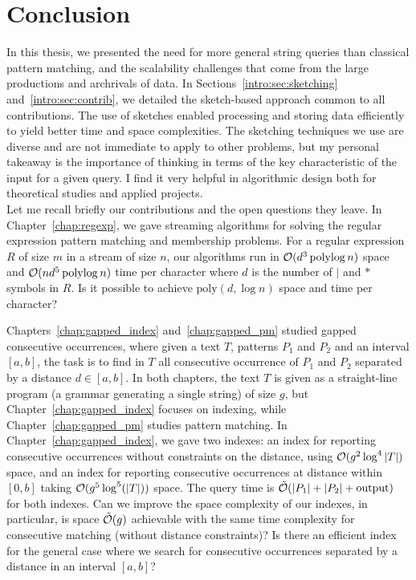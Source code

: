 \clearemptydoublepage
{}
\chapter*{Conclusion}
In this thesis, we presented the need for more general string queries than classical pattern matching, and the scalability challenges that come from the large productions and archrivals of data.
%
In Sections~\ref*{intro:sec:sketching} and~\ref*{intro:sec:contrib}, we detailed the sketch-based approach common to all contributions. The use of sketches enabled processing and storing data efficiently to yield better time and space complexities.
%
The sketching techniques we use are diverse and are not immediate to apply to other problems, but my personal takeaway is the importance of thinking in terms of the key characteristic of the input for a given query. I find it very helpful in algorithmic design both for theoretical studies and applied projects.\\


Let me recall briefly our contributions and the open questions they leave. 
In Chapter~\ref{chap:regexp}, we gave streaming algorithms for solving the regular expression pattern matching and membership problems. For a regular expression $R$ of size $m$ in a stream of size $n$, our algorithms run in $\mathcal{O}(d^3 \operatorname{polylog} n)$ space and $\mathcal{O}(nd^5\operatorname{polylog} n)$ time per character where $d$ is the number of $|$ and $\ast$ symbols in $R$. Is it possible to achieve $\mathrm{poly}(d,\log n)$ space and time per character?

Chapters~\ref{chap:gapped_index} and~\ref{chap:gapped_pm} studied gapped consecutive occurrences, where given a text $T$,  patterns $P_1$ and $P_2$ and an interval $[a,b]$, the task is to find in $T$ all consecutive occurrence of $P_1$ and $P_2$ separated by a distance $d \in [a,b]$. In both chapters, the text $T$ is given as a straight-line program (a grammar generating a single string) of size $g$, but Chapter~\ref{chap:gapped_index} focuses on indexing, while Chapter~\ref{chap:gapped_pm} studies pattern matching. In Chapter~\ref{chap:gapped_index}, we gave two indexes: an index for reporting consecutive occurrences without constraints on the distance, using $\mathcal{O}(g^2\log^4|T|)$ space, and an index for reporting consecutive occurrences at distance within $[0,b]$ taking $\mathcal{O} (g^5\log^5(|T|))$ space. The query time is $\tilde{\mathcal{O}}(|P_1|+|P_2|+\mathrm{output})$ for both indexes. 
%
Can we improve the space complexity of our indexes, in particular, is space $\tilde{\mathcal{O}}(g)$ achievable with the same time complexity for consecutive matching (without distance constraints)? Is there an efficient index for the general case where we search for consecutive occurrences separated by a distance in an interval $[a,b]$?

